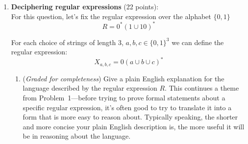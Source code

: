 \documentclass[12pt, oneside]{article}
\newcommand{\gradeCorrect}{({\it Graded for correctness}) }
\newcommand{\gradeComplete}{({\it Graded for completeness}) }
\newcommand{\gradeCompleteFirst}{\gradeComplete\footnote{This means you will 
get full credit so long as your submission demonstrates honest effort to 
answer the question. You will not be penalized for incorrect answers. 
To demonstrate your honest effort in answering the question, we ask 
that you include your attempt to answer *each* part of the question. 
If you get stuck with your attempt, you can still demonstrate 
your effort by explaining where you got stuck and what 
you did to try to get unstuck.} }
\newcommand{\REP}{\textsc{Rep}}
\begin{document}
\begin{enumerate}[wide, labelwidth=!, labelindent=0pt]
\begin{enumerate}
    \item\gradeCompleteFirst Define the language $B$ to 
    be the language over $\Sigma$ described by the regular expression 
    \[
    \Sigma^* 1 \Sigma^*
    \] 
    In plain English, we might explain that $B$ is the set of all 
    strings of $0$s and $1$s that contain a $1$. Give a plain English 
    explanation for the set of strings $\REP(B)$.
    
    \item\gradeCorrect Prove/disprove:
    For every finite language $L$ over $\Sigma$, $\REP(L)$ is also a finite
    set of strings.  A complete answer will either give a general
    argument starting with an arbitrary finite language and proving 
    that the result of applying $\REP$ is also finite, or will give a 
    counterexample (which is a specific example of a finite language 
    $L$ for which applying $\REP$ gives an infinite language, with 
    justification referring back to the relevant definitions).

    {\it Note: A finite language is a set of finitely many strings. 
    This includes the possibility that $L$ is the empty set!}

    \item\gradeComplete Write a template for a regular expression that describes $\REP(L)$
    when $L$ is described by a regular expression $R$.
    You may use union, concatenation, Kleene star, and 
    $\Sigma$, $\Gamma$, and $R$.  (We're using the shorthand for regular expressions
    describing alphabets from page 64.)

    \end{enumerate}

\item \textbf{Deciphering regular expressions} (22 points): \\
    For this question, let's fix the regular expression over the alphabet $\{0,1\}$
    \[
    R = 0^* (1 \cup 10)^*
    \]

    For each choice of strings of length $3$, 
    $a, b, c \in \{0,1\}^3$ we can define the regular
    expression:
    \[
    X_{a,b,c} = 0 (a \cup b \cup c)^* 
    \]
    \begin{enumerate}
    \item \gradeComplete Give a plain English explanation for the language 
    described by the regular expression $R$. 
    This continues a theme from Problem~1---before trying to prove formal statements about a specific regular expression, it's often 
    good to try to translate it into a form that is more easy to reason about. 
    Typically speaking, the shorter and more concise your plain English 
    description is, the more useful it will be in reasoning about the language.
        

\end{enumerate}
\end{enumerate}
\end{document}
